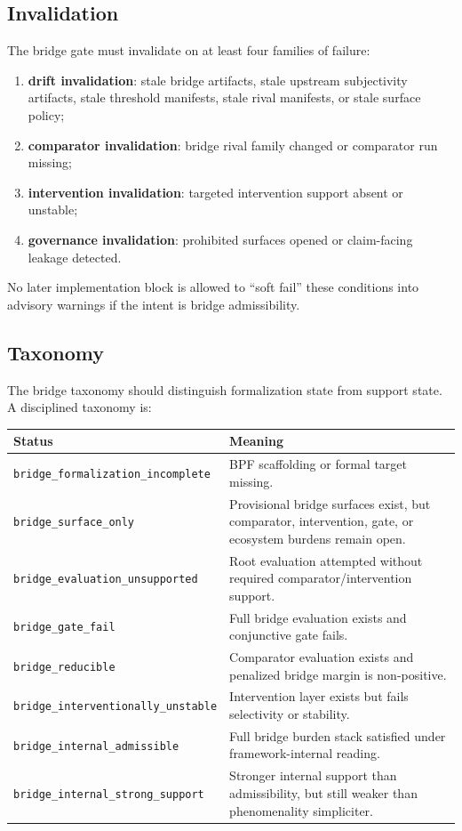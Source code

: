\documentclass[11pt,a4paper]{article}
\theoremstyle{definition}
\begin{document}
\subsection{Invalidation}
The bridge gate must invalidate on at least four families of failure:
\begin{enumerate}[leftmargin=1.5em]
\item \textbf{drift invalidation}: stale bridge artifacts, stale upstream subjectivity artifacts, stale threshold manifests, stale rival manifests, or stale surface policy;
\item \textbf{comparator invalidation}: bridge rival family changed or comparator run missing;
\item \textbf{intervention invalidation}: targeted intervention support absent or unstable;
\item \textbf{governance invalidation}: prohibited surfaces opened or claim-facing leakage detected.
\end{enumerate}
No later implementation block is allowed to ``soft fail'' these conditions into advisory warnings if the intent is bridge admissibility.

\subsection{Taxonomy}
The bridge taxonomy should distinguish formalization state from support state. A disciplined taxonomy is:
\begin{center}
\renewcommand{\arraystretch}{1.15}
\begin{tabularx}{\linewidth}{@{}lY@{}}
\toprule
Status & Meaning \\
\midrule
\texttt{bridge\_formalization\_incomplete} & BPF scaffolding or formal target missing. \\
\texttt{bridge\_surface\_only} & Provisional bridge surfaces exist, but comparator, intervention, gate, or ecosystem burdens remain open. \\
\texttt{bridge\_evaluation\_unsupported} & Root evaluation attempted without required comparator/intervention support. \\
\texttt{bridge\_gate\_fail} & Full bridge evaluation exists and conjunctive gate fails. \\
\texttt{bridge\_reducible} & Comparator evaluation exists and penalized bridge margin is non-positive. \\
\texttt{bridge\_interventionally\_unstable} & Intervention layer exists but fails selectivity or stability. \\
\texttt{bridge\_internal\_admissible} & Full bridge burden stack satisfied under framework-internal reading. \\
\texttt{bridge\_internal\_strong\_support} & Stronger internal support than admissibility, but still weaker than phenomenality simpliciter. \\
\bottomrule
\end{tabularx}
\end{center}
\end{document}
